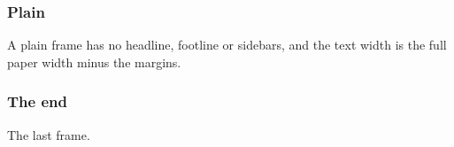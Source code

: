 \documentclass{beamer}
\begin{document}

\begin{frame}[plain]
  \frametitle{Plain}
  A plain frame has no headline, footline or sidebars, and the text width
  is the full paper width minus the margins.
\end{frame}

\begin{frame}
  \frametitle{The end}
  The last frame.
\end{frame}
\end{document}
